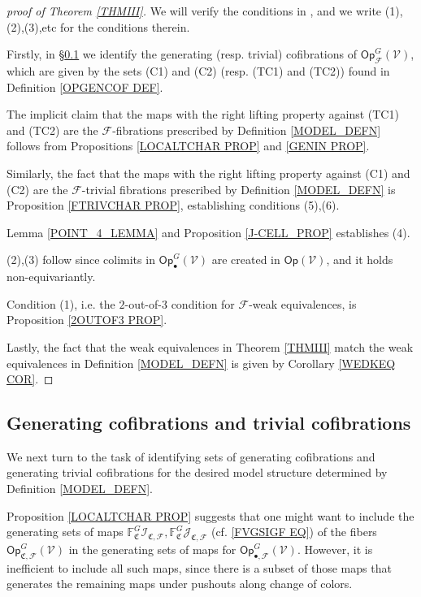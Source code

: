 \documentclass[a4paper,10pt
,draft
]{article}%
\numberwithin{equation}{section}
\numberwithin{figure}{section}
\theoremstyle{definition} %
\newcommand{\Op}{\mathsf{Op}}%
\newcommand{\F}{\ensuremath{\mathcal F}}
\newcommand{\V}{\ensuremath{\mathcal V}}
\newcommand{\1}{\ensuremath{\mathbbm 1}}%
\begin{document}
\begin{proof}[proof of Theorem \ref{THMIII}]
We will verify the conditions in 
\cite[Theorem 2.1.19]{Hov}, and we write (1),(2),(3),etc for the conditions therein.

Firstly, in \S \ref{GENCOF SEC} we identify
the generating (resp. trivial) cofibrations of $\mathsf{Op}^G_{\F}(\V)$,
which are given by the sets 
(C1) and (C2) (resp. (TC1) and (TC2))
found in Definition \ref{OPGENCOF DEF}.

The implicit claim that the maps
with the right lifting property against 
(TC1) and (TC2)
are the $\F$-fibrations prescribed by 
Definition \ref{MODEL_DEFN}
follows from Propositions \ref{LOCALTCHAR PROP} and \ref{GENIN PROP}.

Similarly, the fact that the maps
with the right lifting property against 
(C1) and (C2) are the 
$\F$-trivial fibrations prescribed by 
Definition \ref{MODEL_DEFN}
is Proposition \ref{FTRIVCHAR PROP}, 
establishing conditions (5),(6).

Lemma \ref{POINT_4_LEMMA} and Proposition \ref{J-CELL_PROP} establishes (4).

(2),(3) follow since colimits in $\mathsf{Op}^G_\bullet(\V)$ are created in $\Op(\V)$, and it holds non-equivariantly.

Condition (1), i.e. the $2$-out-of-$3$ condition for $\F$-weak equivalences, 
is Proposition \ref{2OUTOF3 PROP}.

Lastly, the fact that the weak equivalences in 
Theorem \ref{THMIII}
match the weak equivalences in
Definition \ref{MODEL_DEFN} is given by 
Corollary \ref{WEDKEQ COR}.
\end{proof}




\subsection{Generating cofibrations and trivial cofibrations}
\label{GENCOF SEC}

We next turn to the task of identifying sets of generating cofibrations and generating trivial cofibrations
for the desired model structure determined by Definition \ref{MODEL_DEFN}.


Proposition \ref{LOCALTCHAR PROP} suggests that one might want to include the generating sets of maps
$\mathbb{F}^G_{\mathfrak{C}} \mathcal{I}_{\mathfrak{C},\mathcal{F}},
\mathbb{F}^G_{\mathfrak{C}} \mathcal{J}_{\mathfrak{C},\mathcal{F}}$
(cf. \eqref{FVGSIGF EQ}) of the fibers 
$\mathsf{Op}^G_{\mathfrak{C},\F}(\V)$
in the generating sets of maps for 
$\mathsf{Op}^G_{\bullet,\F}(\V)$.
However, it is inefficient to include all such maps, 
since there is a subset of those maps
that generates the remaining maps under pushouts along change of colors.
\end{document}
